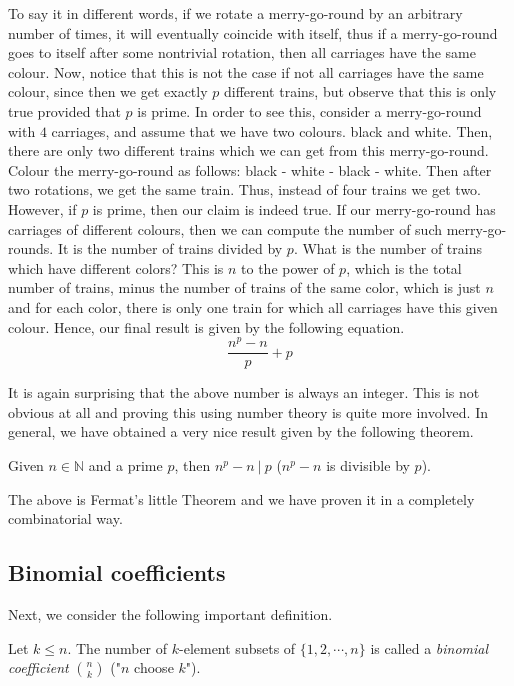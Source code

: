 To say it in different words, if we rotate a merry-go-round by an arbitrary number of times, it will eventually coincide with itself, thus if a merry-go-round goes to itself after some nontrivial rotation, then all carriages have the same colour.
Now, notice that this is not the case if not all carriages have the same colour, since then we get exactly $p$ different trains, but observe that this is only true provided that $p$ is prime. In order to see this, consider a merry-go-round with $4$ carriages,
and assume that we have two colours. black and white. Then, there are only two different trains which we can get from this merry-go-round. Colour the merry-go-round as follows: black - white - black - white. Then after two rotations, we get the same train. Thus, 
instead of four trains we get two. However, if $p$ is prime, then our claim is indeed true.
\newpage
If our merry-go-round has carriages of different colours, then we can compute the number of such merry-go-rounds.
It is the number of trains divided by $p$. What is the number of trains which have different colors?
This is $n$ to the power of $p$, which is the total number of trains, minus the number of trains of the same color, which is just $n$ and for each color, there is only one train for which all carriages have this given colour.
Hence, our final result is given by the following equation.
$$
\frac{n^p-n}{p} + p
$$

It is again surprising that the above number is always an integer. This is not obvious at all and proving this using number theory is quite more involved. In general, we have obtained a very nice result given by the following theorem.

\begin{theorem}
Given $n \in \mathbb{N}$ and a prime $p$, then $n^p -n\ |\ p$ ($n^p - n$ is divisible by $p$).  
\end{theorem}
\noindent
The above is Fermat's little Theorem and we have proven it in a completely combinatorial way.

\subsection{Binomial coefficients}

Next, we consider the following important definition.

\begin{defn}
Let $k \leq n$. The number of $k$-element subsets of $\{1, 2, \cdots, n\}$ is called a \textit{binomial coefficient} ${n \choose k}$ ("$n$ choose $k$").
\end{defn}

